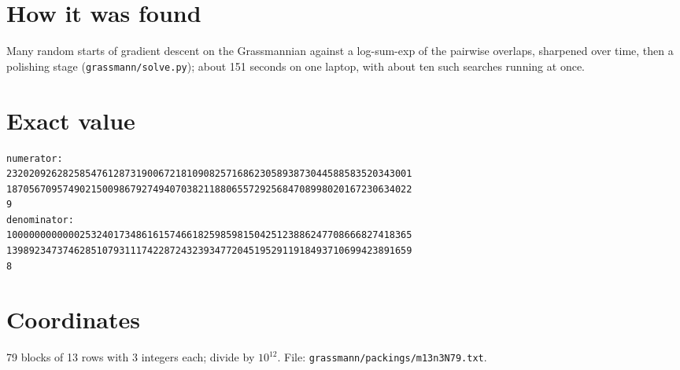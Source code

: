 \documentclass[11pt,a4paper]{article}
\begin{document}
\section{How it was found}
Many random starts of gradient descent on the Grassmannian against a log-sum-exp of the pairwise overlaps, sharpened over time, then a polishing stage (\texttt{grassmann/solve.py}); about 151 seconds on one laptop, with about ten such searches running at once.


\appendix
\section{Exact value}
{\small
\begin{verbatim}
numerator:
232020926282585476128731900672181090825716862305893873044588583520343001
187056709574902150098679274940703821188065572925684708998020167230634022
9
denominator:
100000000000025324017348616157466182598598150425123886247708666827418365
139892347374628510793111742287243239347720451952911918493710699423891659
8
\end{verbatim}}

\section{Coordinates}
79 blocks of 13 rows with 3 integers each; divide by $10^{12}$. File: \texttt{grassmann/packings/m13n3N79.txt}.
{\tiny
\begin{multicols}{3}
\end{multicols}}
\end{document}
